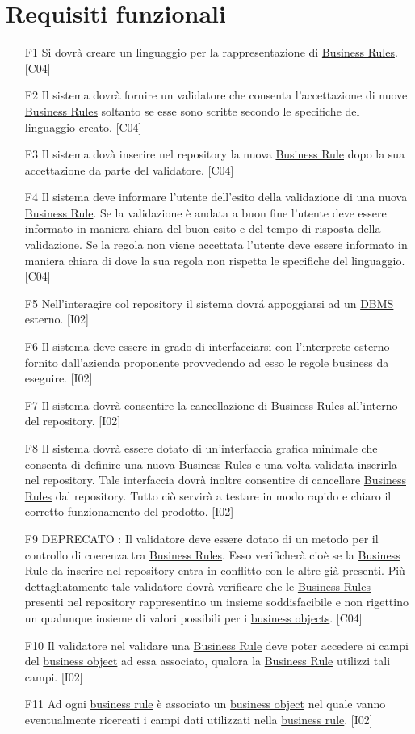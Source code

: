 \section{Requisiti funzionali}
\begin{itemize}
\item[F1]{Si dovr\`a creare un linguaggio per la rappresentazione di \underline{Business Rules}. [C04]}
\item[F2]{Il sistema dovr\`a fornire un validatore che consenta l'accettazione di nuove \underline{Business Rules} soltanto se esse sono scritte secondo le specifiche del linguaggio creato. [C04]}
\item[F3]{Il sistema dov\`a inserire nel repository la nuova \underline{Business Rule} dopo la sua accettazione da parte del validatore. [C04]}
\item[F4]{Il sistema deve informare l'utente dell'esito della validazione di una nuova \underline{Business Rule}. Se la validazione \`e andata a buon fine l'utente deve essere informato in maniera chiara del buon esito e del tempo di risposta della validazione. Se la regola non viene accettata l'utente deve essere informato in maniera chiara di dove la sua regola non rispetta le specifiche del linguaggio. [C04]}
\item[F5]{Nell'interagire col repository il sistema dovr\'a appoggiarsi ad un \underline{DBMS} esterno. [I02]}
\item[F6]{Il sistema deve essere in grado di interfacciarsi con l'interprete esterno fornito dall'azienda proponente provvedendo ad esso le regole business da eseguire. [I02]}
\item[F7]{Il sistema dovr\`a consentire la cancellazione di \underline{Business Rules} all'interno del repository. [I02]}
\item[F8]{Il sistema dovr\`a essere dotato di un'interfaccia grafica minimale che consenta di definire una nuova \underline{Business Rules} e una volta validata inserirla nel repository. Tale interfaccia dovr\`a inoltre consentire di cancellare \underline{Business Rules} dal repository. Tutto ci\`o servir\`a a testare in modo rapido e chiaro il corretto funzionamento del prodotto. [I02]}
\item[F9]{ DEPRECATO : Il validatore deve essere dotato di un metodo per il controllo di coerenza tra \underline{Business Rules}. Esso verificher\`a cio\`e se la \underline{Business Rule} da inserire nel repository entra in conflitto con le altre gi\`a presenti. Pi\`u dettagliatamente tale validatore dovr\`a verificare che le \underline{Business Rules} presenti nel repository rappresentino un insieme soddisfacibile e non rigettino un qualunque insieme di valori possibili per i \underline{business objects}. [C04]}
\item[F10]{Il validatore nel validare una \underline{Business Rule} deve poter accedere ai campi del \underline{business object} ad essa associato, qualora la \underline{Business Rule} utilizzi tali campi. [I02]}
\item[F11]{Ad ogni \underline{business rule} \`e associato un \underline{business object} nel quale vanno eventualmente ricercati i campi dati utilizzati nella \underline{business rule}. [I02]}
\end{itemize}

